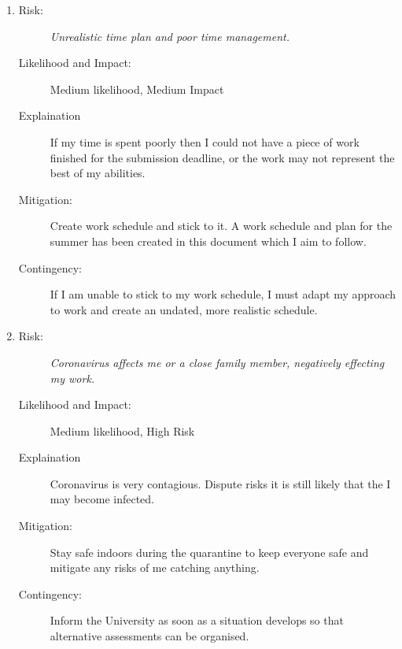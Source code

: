 \documentclass{article}
\begin{document}
\begin{enumerate}
    \item 
    \begin{description}
        \item[Risk:]    
        \emph{Unrealistic time plan and poor time management.}
        \item[Likelihood and Impact:]
        Medium likelihood, Medium Impact
        \item[Explaination]
        If my time is spent poorly then I could not have a piece of work finished for the submission deadline, or the work may not represent the best of my abilities.  
        \item[Mitigation:]
        Create work schedule and stick to it.
        A work schedule and plan for the summer has been created in this document which I aim to follow.
        \item[Contingency:]
        If I am unable to stick to my work schedule, I must adapt my approach to work and create an undated, more realistic schedule.
    \end{description}

    \item 
    \begin{description}
        \item[Risk:]
        \emph{Coronavirus affects me or a close family member, negatively effecting my work.}
        \item[Likelihood and Impact:]
        Medium likelihood, High Risk
        \item[Explaination]
        Coronavirus is very contagious. 
        Dispute risks it is still likely that the I may become infected. 
        \item[Mitigation:]
        Stay safe indoors during the quarantine to keep everyone safe and mitigate any risks of me catching anything.
        \item[Contingency:]
        Inform the University as soon as a situation develops so that alternative assessments can be organised.
    \end{description}


\end{enumerate}
\end{document}
